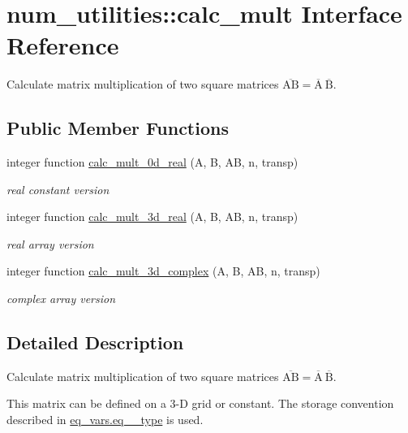 \hypertarget{interfacenum__utilities_1_1calc__mult}{}\section{num\+\_\+utilities\+:\+:calc\+\_\+mult Interface Reference}
\label{interfacenum__utilities_1_1calc__mult}


Calculate matrix multiplication of two square matrices $\overline{\text{AB}} = \overline{\text{A}} \ \overline{\text{B}}$.  


\subsection*{Public Member Functions}
\begin{DoxyCompactItemize}
\item 
integer function \hyperlink{interfacenum__utilities_1_1calc__mult_a404b90dac43d8c44d78489358d0c618d}{calc\+\_\+mult\+\_\+0d\+\_\+real} (A, B, AB, n, transp)
\begin{DoxyCompactList}\small\item\em real constant version \end{DoxyCompactList}\item 
integer function \hyperlink{interfacenum__utilities_1_1calc__mult_aaffbf7ea407fe92d7bd966f5bc424fff}{calc\+\_\+mult\+\_\+3d\+\_\+real} (A, B, AB, n, transp)
\begin{DoxyCompactList}\small\item\em real array version \end{DoxyCompactList}\item 
integer function \hyperlink{interfacenum__utilities_1_1calc__mult_afd24f49d518588fc5f40fbf5572b45ff}{calc\+\_\+mult\+\_\+3d\+\_\+complex} (A, B, AB, n, transp)
\begin{DoxyCompactList}\small\item\em complex array version \end{DoxyCompactList}\end{DoxyCompactItemize}


\subsection{Detailed Description}
Calculate matrix multiplication of two square matrices $\overline{\text{AB}} = \overline{\text{A}} \ \overline{\text{B}}$. 

This matrix can be defined on a 3-\/D grid or constant. The storage convention described in \hyperlink{structeq__vars_1_1eq__2__type}{eq\+\_\+vars.\+eq\+\_\+\_\+type} is used.

